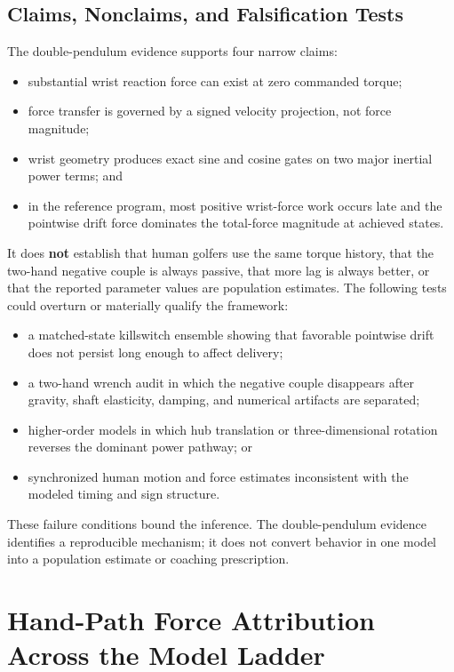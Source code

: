 \documentclass[
  letterpaper,
]{report}
\providecommand{\tightlist}{%
  \setlength{\itemsep}{0pt}\setlength{\parskip}{0pt}}
\begin{document}
\section{Claims, Nonclaims, and Falsification
Tests}\label{sec-force-claims}

The double-pendulum evidence supports four narrow claims:

\begin{itemize}
\tightlist
\item
  substantial wrist reaction force can exist at zero commanded torque;
\item
  force transfer is governed by a signed velocity projection, not force
  magnitude;
\item
  wrist geometry produces exact sine and cosine gates on two major
  inertial power terms; and
\item
  in the reference program, most positive wrist-force work occurs late
  and the pointwise drift force dominates the total-force magnitude at
  achieved states.
\end{itemize}

It does \textbf{not} establish that human golfers use the same torque
history, that the two-hand negative couple is always passive, that more
lag is always better, or that the reported parameter values are
population estimates. The following tests could overturn or materially
qualify the framework:

\begin{itemize}
\tightlist
\item
  a matched-state killswitch ensemble showing that favorable pointwise
  drift does not persist long enough to affect delivery;
\item
  a two-hand wrench audit in which the negative couple disappears after
  gravity, shaft elasticity, damping, and numerical artifacts are
  separated;
\item
  higher-order models in which hub translation or three-dimensional
  rotation reverses the dominant power pathway; or
\item
  synchronized human motion and force estimates inconsistent with the
  modeled timing and sign structure.
\end{itemize}

These failure conditions bound the inference. The double-pendulum
evidence identifies a reproducible mechanism; it does not convert
behavior in one model into a population estimate or coaching
prescription.

\chapter{Hand-Path Force Attribution Across the Model
Ladder}\label{sec-hand-path-attribution}
\end{document}
